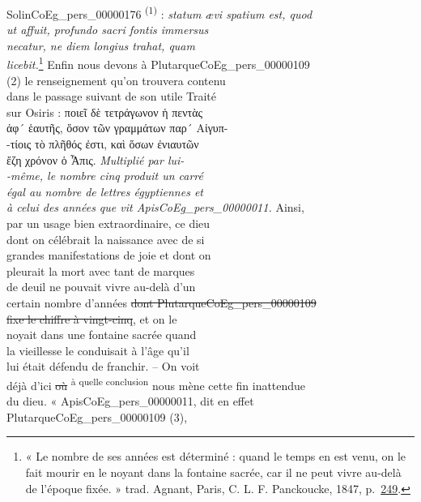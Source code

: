 \documentclass{book}
\begin{document}
{\begin{paracol}{2}
Solin\gls{CoEg_pers_00000176} \textsuperscript{(1)} : \textit{statum ævi spatium est, quod\\
ut affuit, profundo sacri fontis immersus\\
necatur, ne diem longius trahat, quam\\
licebit.}\footnote{« Le nombre de ses années est déterminé : quand le temps en est venu, on le fait mourir en le noyant dans la fontaine sacrée, car il ne peut vivre au-delà de l’époque fixée. » trad. Agnant, Paris, C. L. F. Panckoucke, 1847, p.~\href{https://gallica.bnf.fr/ark:/12148/bpt6k23660m/f251}{249}.} Enfin nous devons à Plutarque\gls{CoEg_pers_00000109}\\
(2) le renseignement qu’on trouvera contenu\\
dans le passage suivant de son utile Traité\\
sur Osiris : ποιεῖ δὲ τετράγωνον ἡ πεντὰς\\
ἀφ´ ἑαυτῆς, ὅσον τῶν γραμμάτων παρ´ Αἰγυπ-\\
-τίοις τὸ πλῆθός ἐστι, καὶ ὅσων ἐνιαυτῶν\\
ἔζη χρόνον ὁ Ἆπις. \textit{Multiplié par lui-\\
-même, le nombre cinq produit un carré\\
égal au nombre de lettres égyptiennes et\\
à celui des années que vit Apis\gls{CoEg_pers_00000011}.} Ainsi,\\
par un usage bien extraordinaire, ce dieu\\
dont on célébrait la naissance avec de si\\
grandes manifestations de joie et dont on\\
pleurait la mort avec tant de marques\\
de deuil ne pouvait vivre au-delà d’un\\
certain nombre d’années \sout{dont Plutarque\gls{CoEg_pers_00000109}\\
fixe le chiffre à vingt-cinq}, et on le\\
noyait dans une fontaine sacrée quand\\
la vieillesse le conduisait à l’âge qu’il\\
lui était défendu de franchir. – On voit\\
\scriptsize{déjà d’ici \sout{où} \textsuperscript{à quelle conclusion} nous mène cette fin inattendue}\\
\footnotesize {du dieu. « Apis\gls{CoEg_pers_00000011}, dit en effet Plutarque\gls{CoEg_pers_00000109} (3),}\\

\end{paracol}}
\end{document}
